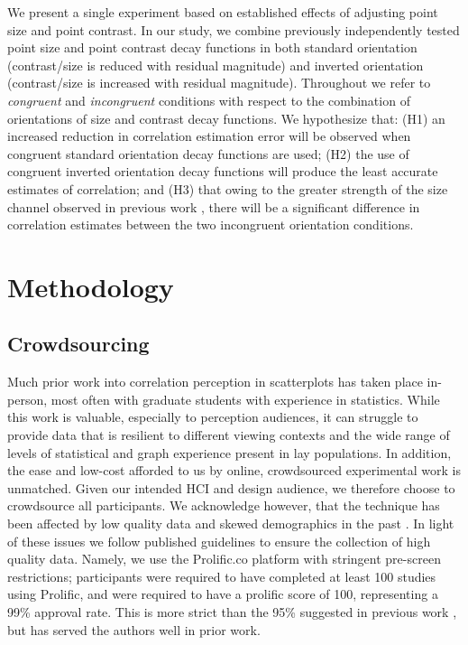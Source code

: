 \documentclass[manuscript, review, anonymous, screen]{acmart}
\begin{document}
We present a single experiment based on established effects of adjusting
point size and point contrast. In our study, we combine previously
independently tested point size and point contrast decay functions in
both standard orientation (contrast/size is reduced with residual
magnitude) and inverted orientation (contrast/size is increased with
residual magnitude). Throughout we refer to \emph{congruent} and
\emph{incongruent} conditions with respect to the combination of orientations of size
and contrast decay functions. We hypothesize that: (H1) an increased
reduction in correlation estimation error will be observed when congruent standard
orientation decay functions are used; (H2) the use of congruent inverted
orientation decay functions will produce the least accurate estimates of
correlation; and (H3) that owing to the greater strength of the size
channel observed in previous work \citep{strain_2023b}, there will be a
significant difference in correlation estimates between the two
incongruent orientation conditions.

\hypertarget{sec-methods}{%
\section{Methodology}\label{sec-methods}}

\hypertarget{sec-crowdsourcing}{%
\subsection{Crowdsourcing}\label{sec-crowdsourcing}}

Much prior work into correlation perception in scatterplots has taken
place in-person, most often with graduate students with experience in
statistics. While this work is valuable, especially to perception
audiences, it can struggle to provide data that is resilient to
different viewing contexts and the wide range of levels of statistical
and graph experience present in lay populations. In addition, the ease
and low-cost afforded to us by online, crowdsourced experimental work is
unmatched. Given our intended HCI and design audience, we therefore
choose to crowdsource all participants. We acknowledge however, that the
technique has been affected by low quality data and skewed demographics
in the past \citep{chmielewski_2020, charalambides_2021, peer_2021}. In
light of these issues we follow published guidelines \citep{peer_2021}
to ensure the collection of high quality data. Namely, we use the
Prolific.co platform \citep{prolific} with stringent pre-screen
restrictions; participants were required to have completed at least 100
studies using Prolific, and were required to have a prolific score of
100, representing a 99\% approval rate. This is more strict than the
95\% suggested in previous work \citep{peer_2021}, but has served the
authors well in prior work.
\end{document}
